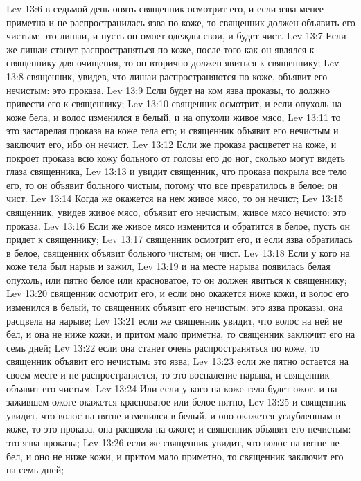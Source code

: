 Lev 13:6  в седьмой день опять священник осмотрит его, и если язва менее приметна и не распространилась язва по коже, то священник должен объявить его чистым: это лишаи, и пусть он омоет одежды свои, и будет чист.
Lev 13:7  Если же лишаи станут распространяться по коже, после того как он являлся к священнику для очищения, то он вторично должен явиться к священнику;
Lev 13:8  священник, увидев, что лишаи распространяются по коже, объявит его нечистым: это проказа.
Lev 13:9  Если будет на ком язва проказы, то должно привести его к священнику;
Lev 13:10  священник осмотрит, и если опухоль на коже бела, и волос изменился в белый, и на опухоли живое мясо,
Lev 13:11  то это застарелая проказа на коже тела его; и священник объявит его нечистым и заключит его, ибо он нечист.
Lev 13:12  Если же проказа расцветет на коже, и покроет проказа всю кожу больного от головы его до ног, сколько могут видеть глаза священника,
Lev 13:13  и увидит священник, что проказа покрыла все тело его, то он объявит больного чистым, потому что все превратилось в белое: он чист.
Lev 13:14  Когда же окажется на нем живое мясо, то он нечист;
Lev 13:15  священник, увидев живое мясо, объявит его нечистым; живое мясо нечисто: это проказа.
Lev 13:16  Если же живое мясо изменится и обратится в белое, пусть он придет к священнику;
Lev 13:17  священник осмотрит его, и если язва обратилась в белое, священник объявит больного чистым; он чист.
Lev 13:18  Если у кого на коже тела был нарыв и зажил,
Lev 13:19  и на месте нарыва появилась белая опухоль, или пятно белое или красноватое, то он должен явиться к священнику;
Lev 13:20  священник осмотрит его, и если оно окажется ниже кожи, и волос его изменился в белый, то священник объявит его нечистым: это язва проказы, она расцвела на нарыве;
Lev 13:21  если же священник увидит, что волос на ней не бел, и она не ниже кожи, и притом мало приметна, то священник заключит его на семь дней;
Lev 13:22  если она станет очень распространяться по коже, то священник объявит его нечистым: это язва;
Lev 13:23  если же пятно остается на своем месте и не распространяется, то это воспаление нарыва, и священник объявит его чистым.
Lev 13:24  Или если у кого на коже тела будет ожог, и на зажившем ожоге окажется красноватое или белое пятно,
Lev 13:25  и священник увидит, что волос на пятне изменился в белый, и оно окажется углубленным в коже, то это проказа, она расцвела на ожоге; и священник объявит его нечистым: это язва проказы;
Lev 13:26  если же священник увидит, что волос на пятне не бел, и оно не ниже кожи, и притом мало приметно, то священник заключит его на семь дней;
